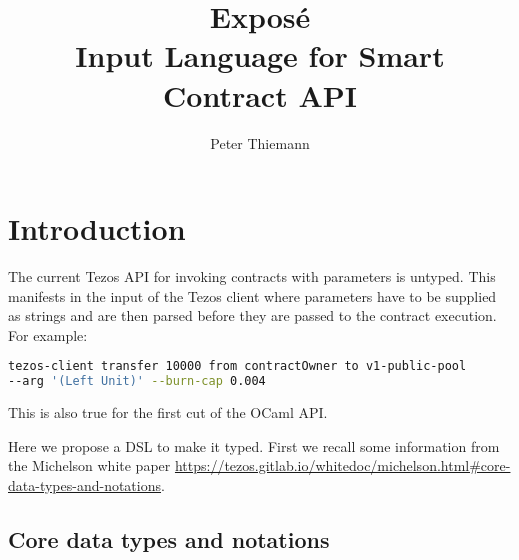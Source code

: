 \documentclass{article}
\title{Expos\'{e}\\
  Input Language for Smart Contract API}
\author{Peter Thiemann}
\begin{document}
\maketitle{}

\section{Introduction}
\label{sec:introduction}

The current Tezos API for invoking contracts with parameters is
untyped. This manifests in the input of the Tezos client where
parameters have to be supplied as strings and are then parsed before
they are passed to the contract execution. For example:
\begin{lstlisting}[language=sh]
tezos-client transfer 10000 from contractOwner to v1-public-pool 
--arg '(Left Unit)' --burn-cap 0.004
\end{lstlisting}
This is also true for the first cut of the OCaml API.

 Here we propose a DSL to make it typed.
First we recall some information from the Michelson white paper
\url{https://tezos.gitlab.io/whitedoc/michelson.html#core-data-types-and-notations}. 

\subsection{Core data types and notations}
\end{document}
